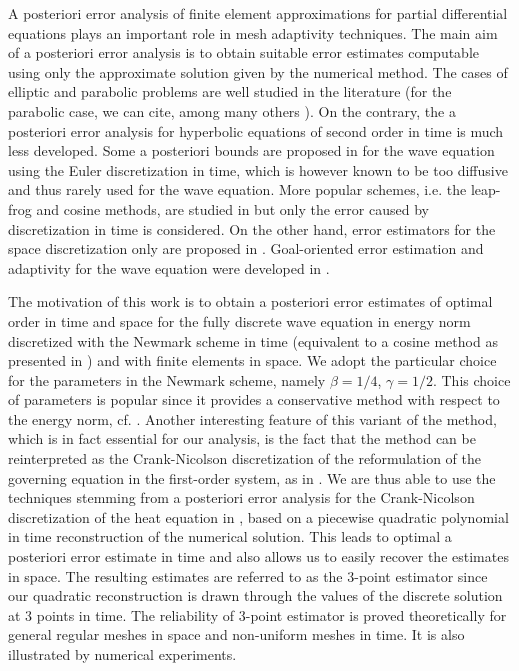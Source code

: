 \documentclass{imanum}
\begin{document}
A posteriori error analysis of finite element approximations for partial differential equations plays an important role in mesh adaptivity techniques. The main aim of a posteriori error analysis is to obtain suitable error estimates computable using only the approximate solution given by the numerical method. The cases of elliptic and parabolic problems are well studied in the literature (for the parabolic case, we can cite, among many others \cite{ ErikssonJohnson, AMN, LPP, LakkisMakridakisPryer}). On the contrary, the a posteriori error analysis for hyperbolic equations  of second order in time is much less developed. Some a posteriori bounds are proposed in \cite{BS, Georgoulis13} for the wave equation using the Euler discretization in time, which is however known to be too diffusive and thus rarely used for the wave equation. More popular schemes, i.e. the leap-frog and cosine methods, are studied in \cite{Georgoulis16} but only the error caused by discretization in time is considered. On the other hand, error estimators for the space discretization only are proposed in \cite{Picasso10, adjerid2002posteriori}. Goal-oriented error estimation and adaptivity for the wave equation were developed in \cite{bangerth2010adaptive, bangerth2001adaptive, bangerth1999finite}.

The motivation of this work is to obtain a posteriori error estimates of optimal order in time and space for the fully discrete wave equation in energy norm discretized with the Newmark scheme in time (equivalent to a cosine method as presented in \cite{Georgoulis16}) and  with finite elements in space. We adopt the particular choice for the parameters in the Newmark scheme, namely $\beta=1/4 $, $\gamma=1/2$. This choice of parameters is popular since it provides a conservative method with respect to the energy norm, cf.  \cite{bathe1976numerical}. Another interesting feature of this variant of the method, which is in fact essential for our analysis, is the fact that the method can be reinterpreted as the Crank-Nicolson discretization of the reformulation of the governing equation in the first-order system, as in \cite{Baker76}. We are thus able to use the techniques stemming  from a posteriori error analysis for the Crank-Nicolson discretization of the heat equation in \cite{LPP}, based  on a piecewise quadratic polynomial in time reconstruction of the numerical solution.   This leads to
optimal a posteriori error estimate in time and also allows us to easily  recover the estimates in space. The resulting estimates are referred to as the $3$-point estimator since our quadratic reconstruction is drawn through the values of the discrete solution at 3 points in time. The reliability of 3-point estimator is proved theoretically for general regular meshes in space and non-uniform meshes in time. It is also illustrated by numerical experiments. 
\end{document}
